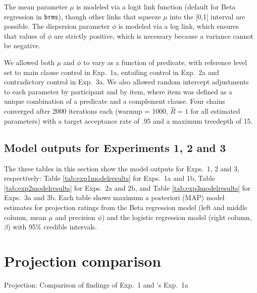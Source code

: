 \documentclass[11pt,fleqn]{article}
\newcommand{\6}{\mbox{$[\hspace*{-.6mm}[$}}
\newcommand{\9}{\mbox{$]\hspace*{-.6mm}]$}}
\newcommand{\citepos}[1]{\citeauthor{#1}'s \citeyear{#1}}
\begin{document}
The mean parameter $\mu$ is modeled via a logit link function (default for Beta regression in \verb|brms|), though other links that squeeze $\mu$ into the $[$0,1$]$ interval are possible. The dispersion parameter $\phi$ is modeled via a log link, which ensures that values of $\phi$ are strictly positive, which is necessary because a variance cannot be negative. 

We allowed both $\mu$ and $\phi$ to vary as a function of predicate, with reference level set to main clause control in Exp.~1a, entailing control in Exp.~2a and contradictory control in Exp.~3a. We also allowed random intercept adjustments to each parameter by participant and by item, where item was defined as a unique combination of a predicate and a complement clause. Four chains converged after 2000 iterations each (warmup = 1000, \(\hat{R}=1\) for all estimated parameters) with a target acceptance rate of .95 and a maximum treedepth of 15.

\subsection{Model outputs for Experiments 1, 2 and 3}\label{a-mo}

The three tables in this section show the model outputs for Exps.~1, 2 and 3, respectively: Table \ref{tab:exp1modelresults} for Exps.~1a and 1b, Table \ref{tab:exp2modelresults} for Exps.~2a and 2b, and Table \ref{tab:exp3modelresults} for Exps.~3a and 3b. Each table shows maximum a posteriori (MAP) model estimates for projection ratings from the Beta regression model (left and middle column, mean $\mu$ and precision $\phi$) and the logistic regression model (right column, $\beta$)  with 95\% credible intervals.

\section{Projection comparison}\label{a-comparison}

Projection: Comparison of findings of Exp.~1 and \citepos{tonhauser-degen-factive} Exp.~1a
\end{document}
